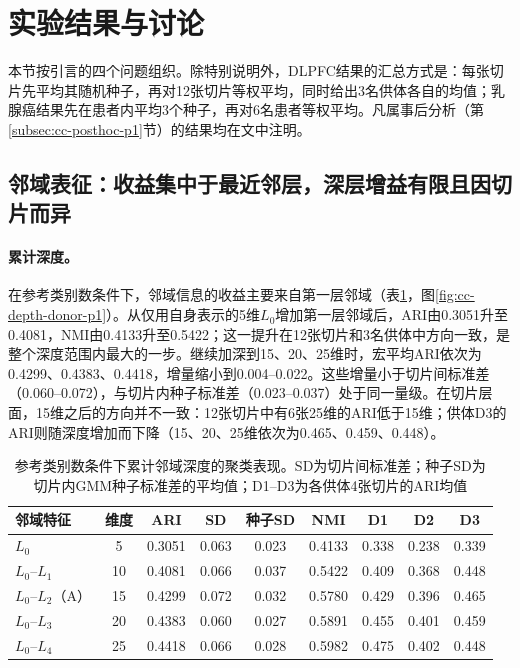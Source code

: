 \section{实验结果与讨论}
\label{sec:cc-results-p1}

本节按引言的四个问题组织。除特别说明外，DLPFC结果的汇总方式是：每张切片先平均其随机种子，再对12张切片等权平均，同时给出3名供体各自的均值；乳腺癌结果先在患者内平均3个种子，再对6名患者等权平均。凡属事后分析（第\ref{subsec:cc-posthoc-p1}节）的结果均在文中注明。

\subsection{邻域表征：收益集中于最近邻层，深层增益有限且因切片而异}
\label{subsec:cc-res-neighborhood-p1}

\paragraph{累计深度。}在参考类别数条件下，邻域信息的收益主要来自第一层邻域（表\ref{tab:cc-depth-p1}，图\ref{fig:cc-depth-donor-p1}）。从仅用自身表示的5维$L_0$增加第一层邻域后，ARI由0.3051升至0.4081，NMI由0.4133升至0.5422；这一提升在12张切片和3名供体中方向一致，是整个深度范围内最大的一步。继续加深到15、20、25维时，宏平均ARI依次为0.4299、0.4383、0.4418，增量缩小到0.004--0.022。这些增量小于切片间标准差（0.060--0.072），与切片内种子标准差（0.023--0.037）处于同一量级。在切片层面，15维之后的方向并不一致：12张切片中有6张25维的ARI低于15维；供体D3的ARI则随深度增加而下降（15、20、25维依次为0.465、0.459、0.448）。

\begin{table}[htbp]
\centering
\caption{参考类别数条件下累计邻域深度的聚类表现。SD为切片间标准差；种子SD为切片内GMM种子标准差的平均值；D1--D3为各供体4张切片的ARI均值}
\label{tab:cc-depth-p1}
\small
\begin{tabular}{lcccccccc}
\toprule
邻域特征 & 维度 & ARI & SD & 种子SD & NMI & D1 & D2 & D3\\
\midrule
$L_0$ & 5 & 0.3051 & 0.063 & 0.023 & 0.4133 & 0.338 & 0.238 & 0.339\\
$L_0$--$L_1$ & 10 & 0.4081 & 0.066 & 0.037 & 0.5422 & 0.409 & 0.368 & 0.448\\
$L_0$--$L_2$（A） & 15 & 0.4299 & 0.072 & 0.032 & 0.5780 & 0.429 & 0.396 & 0.465\\
$L_0$--$L_3$ & 20 & 0.4383 & 0.060 & 0.027 & 0.5891 & 0.455 & 0.401 & 0.459\\
$L_0$--$L_4$ & 25 & 0.4418 & 0.066 & 0.028 & 0.5982 & 0.475 & 0.402 & 0.448\\
\bottomrule
\end{tabular}
\end{table}

